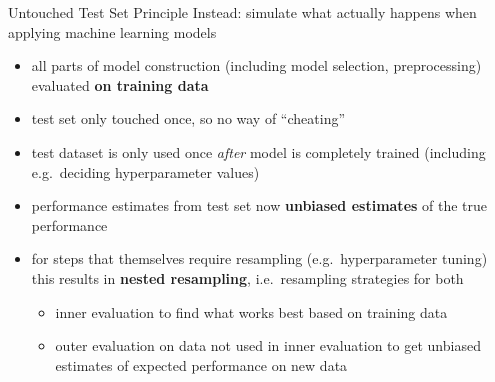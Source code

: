     \begin{frame}[c,allowframebreaks]{Untouched Test Set Principle}
    Instead: simulate what actually happens when applying machine learning
    models

    \begin{itemize}
    \item all parts of model construction (including model selection,
      preprocessing) evaluated \textbf{on training data}
    \item test set only touched once, so no way of ``cheating''
    \item test dataset is only used once \emph{after} model is completely
        trained (including e.g.\ deciding hyperparameter values)
    \item performance estimates from test set now \textbf{unbiased estimates} of the true performance

    \framebreak

    \item for steps that themselves require resampling (e.g.\ hyperparameter tuning) this results
      in \textbf{nested resampling}, i.e.\ resampling strategies for both
      \begin{itemize} 
      \item inner evaluation to find what works best based on training data 
      \item outer evaluation on data not used in inner evaluation to get unbiased estimates of expected performance on new data
      \end{itemize}
    \end{itemize}
    \end{frame}

